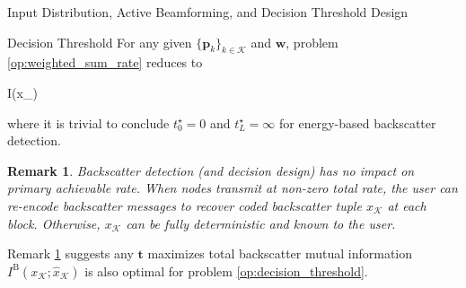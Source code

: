 \documentclass[journal]{IEEEtran}
\newtheorem{remark}{Remark}
\begin{document}
\begin{section}{Input Distribution, Active Beamforming, and Decision Threshold Design}
	\begin{subsection}{Decision Threshold}
		For any given $\{\boldsymbol{p}_k\}_{k \in \mathcal{K}}$ and $\boldsymbol{w}$, problem \eqref{op:weighted_sum_rate} reduces to
		\begin{maxi!}
			{}{I(x_{})}{\label{op:decision_threshold}}{\label{ob:decision_threshold}}
			\addConstraint{\eqref{co:decision_threshold},}
		\end{maxi!}
		where it is trivial to conclude $t_0^\star=0$ and $t_L^\star=\infty$ for energy-based backscatter detection.

		\begin{remark}
			Backscatter detection (and decision design) has no impact on primary achievable rate.
			When nodes transmit at non-zero total rate, the user can re-encode backscatter messages to recover coded backscatter tuple $x_{\mathcal{K}}$ at each block.
			Otherwise, $x_{\mathcal{K}}$ can be fully deterministic and known to the user.
			\label{re:backscatter_detection}
		\end{remark}

		Remark \ref{re:backscatter_detection} suggests any $\boldsymbol{t}$ maximizes total backscatter mutual information $I^{\mathrm{B}}(x_{\mathcal{K}};\hat{x}_{\mathcal{K}})$ is also optimal for problem \eqref{op:decision_threshold}.


\end{subsection}
\end{section}
\end{document}
